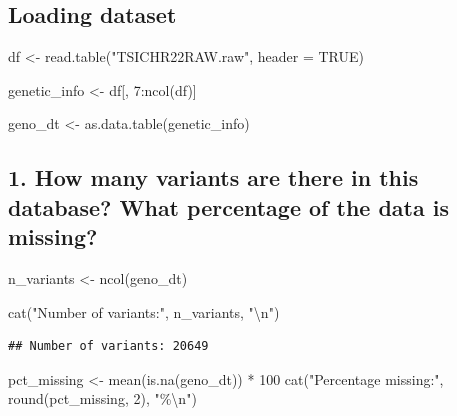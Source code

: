 \documentclass[
]{article}
\newenvironment{Shaded}{\begin{snugshade}}{\end{snugshade}}
\newcommand{\AttributeTok}[1]{\textcolor[rgb]{0.77,0.63,0.00}{#1}}
\newcommand{\ConstantTok}[1]{\textcolor[rgb]{0.00,0.00,0.00}{#1}}
\newcommand{\DecValTok}[1]{\textcolor[rgb]{0.00,0.00,0.81}{#1}}
\newcommand{\FunctionTok}[1]{\textcolor[rgb]{0.00,0.00,0.00}{#1}}
\newcommand{\NormalTok}[1]{#1}
\newcommand{\OtherTok}[1]{\textcolor[rgb]{0.56,0.35,0.01}{#1}}
\newcommand{\SpecialCharTok}[1]{\textcolor[rgb]{0.00,0.00,0.00}{#1}}
\newcommand{\StringTok}[1]{\textcolor[rgb]{0.31,0.60,0.02}{#1}}
\begin{document}
\hypertarget{loading-dataset}{%
\subsection{Loading dataset}\label{loading-dataset}}

\begin{Shaded}
\begin{Highlighting}[]
\NormalTok{df }\OtherTok{\textless{}{-}} \FunctionTok{read.table}\NormalTok{(}\StringTok{"TSICHR22RAW.raw"}\NormalTok{, }\AttributeTok{header =} \ConstantTok{TRUE}\NormalTok{)}

\NormalTok{genetic\_info }\OtherTok{\textless{}{-}}\NormalTok{ df[, }\DecValTok{7}\SpecialCharTok{:}\FunctionTok{ncol}\NormalTok{(df)]}

\NormalTok{geno\_dt }\OtherTok{\textless{}{-}} \FunctionTok{as.data.table}\NormalTok{(genetic\_info)}
\end{Highlighting}
\end{Shaded}

\hypertarget{how-many-variants-are-there-in-this-database-what-percentage-of-the-data-is-missing}{%
\subsection{1. How many variants are there in this database? What
percentage of the data is
missing?}\label{how-many-variants-are-there-in-this-database-what-percentage-of-the-data-is-missing}}

\begin{Shaded}
\begin{Highlighting}[]
\NormalTok{n\_variants }\OtherTok{\textless{}{-}} \FunctionTok{ncol}\NormalTok{(geno\_dt)}

\FunctionTok{cat}\NormalTok{(}\StringTok{"Number of variants:"}\NormalTok{, n\_variants, }\StringTok{"}\SpecialCharTok{\textbackslash{}n}\StringTok{"}\NormalTok{)}
\end{Highlighting}
\end{Shaded}

\begin{verbatim}
## Number of variants: 20649
\end{verbatim}

\begin{Shaded}
\begin{Highlighting}[]
\NormalTok{pct\_missing }\OtherTok{\textless{}{-}} \FunctionTok{mean}\NormalTok{(}\FunctionTok{is.na}\NormalTok{(geno\_dt)) }\SpecialCharTok{*} \DecValTok{100}
\FunctionTok{cat}\NormalTok{(}\StringTok{"Percentage missing:"}\NormalTok{, }\FunctionTok{round}\NormalTok{(pct\_missing, }\DecValTok{2}\NormalTok{), }\StringTok{"\%}\SpecialCharTok{\textbackslash{}n}\StringTok{"}\NormalTok{)}
\end{Highlighting}
\end{Shaded}
\end{document}
